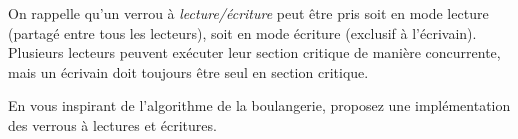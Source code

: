 
\begingroup

\begin{exercice}
  \label{exo:locks/readwrite}

  On rappelle qu'un verrou à \emph{lecture/écriture} peut être pris soit en
  mode lecture (partagé entre tous les lecteurs),
  soit en mode écriture (exclusif à l'écrivain).
  Plusieurs lecteurs peuvent exécuter leur section critique de manière
  concurrente, mais un écrivain doit toujours être seul en section critique. 

  \begin{questions}
  \item En vous inspirant de l'algorithme de la boulangerie,
    proposez une implémentation des verrous à lectures et écritures.
  \end{questions}

\end{exercice}

\endgroup
\endinput
